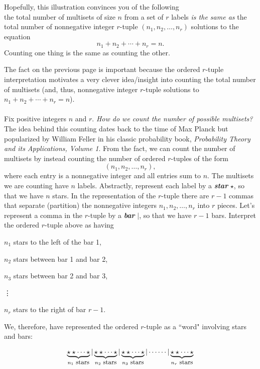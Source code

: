\documentclass[12pt]{article}
\begin{document}
Hopefully, this illustration convinces you of the following\\

 the total number of multisets of size $n$ from a set of $r$ labels
{\em is the same as} the total number of nonnegative integer $r$-tuple $(n_1, n_2,\dots, n_r)$ solutions to the equation
$$n_1+n_2+\cdots + n_r=n.$$
Counting one thing is the same as counting the other.



\newpage

\noindent The fact on the previous page is important because the ordered $r$-tuple interpretation motivates a very clever idea/insight
into counting the total number of multisets (and, thus, nonnegative integer $r$-tuple solutions to $n_1+n_2+\cdots + n_r=n$). \\

\\
Fix positive integers $n$ and $r$.  {\em How do we count the number of possible multisets?}\\
\noindent The idea behind this counting dates back to the time of Max Planck but popularized by
William Feller in his classic probability book, {\em Probability Theory and its Applications, Volume 1}.
From the fact, we can count the number of multisets by instead counting the number of ordered $r$-tuples of the form
$$(n_1,n_2,\dots,n_r),$$
where each entry is a nonnegative integer and all entries sum to $n$.
The multisets we are counting have $n$ labels.  Abstractly, represent each label by a {\em\bf star} $\star$, so that we have $n$ stars.
In the representation of the $r$-tuple there are $r-1$ commas that separate (partition) the nonnegative integers $n_1,n_2,\dots, n_r$ into $r$ pieces.
Let's represent a comma in the $r$-tuple by a {\bf\em bar} $|$, so that we have $r-1$ bars.
Interpret the ordered $r$-tuple above as having

$n_1$ stars to the left of the bar 1,

$n_2$ stars between bar 1 and bar 2,

$n_3$ stars between bar 2 and bar 3,

\qquad\quad \vdots

$n_r$ stars to the right of bar $r-1$.

\noindent We, therefore, have represented the ordered $r$-tuple as a ``word" involving stars and bars:

$$\underbrace{\star\star\cdots\star}_{n_1\mbox{\small \ stars}} | \underbrace{\star\star\cdots\star}_{n_2\mbox{\small \ stars}} | \underbrace{\star\star\cdots\star}_{n_3\mbox{\small \ stars}} |\cdots \cdots | \underbrace{\star\star\cdots\star}_{n_r\mbox{\small \ stars}}$$
\end{document}
